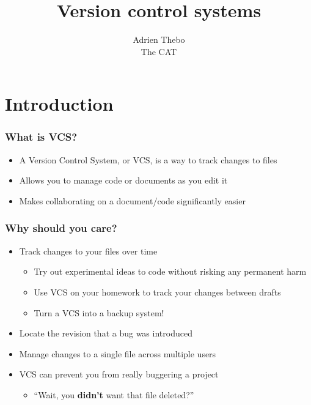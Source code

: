 \documentclass{beamer}
\title{Version control systems}
\author{Adrien Thebo \\
The CAT
}
\begin{document}
\begin{frame}
  \titlepage
\end{frame}

\section{Introduction}

\begin{frame}
  \frametitle{What is VCS?}
  \begin{itemize}
    \item A Version Control System, or VCS, is a way to track changes to files
    \item Allows you to manage code or documents as you edit it
    \item Makes collaborating on a document/code significantly easier
  \end{itemize}
\end{frame}

\begin{frame}
  \frametitle{Why should you care?}
  \begin{itemize}
    \item Track changes to your files over time
      \begin{itemize}
	\item Try out experimental ideas to code without risking any permanent harm
	\item Use VCS on your homework to track your changes between drafts
	\item Turn a VCS into a backup system!
      \end{itemize}
    \item Locate the revision that a bug was introduced
    \item Manage changes to a single file across multiple users
    \item VCS can prevent you from really buggering a project
      \begin{itemize}
	\item ``Wait, you {\bf didn't} want that file deleted?''
      \end{itemize}
  \end{itemize}
\end{frame}
\end{document}
